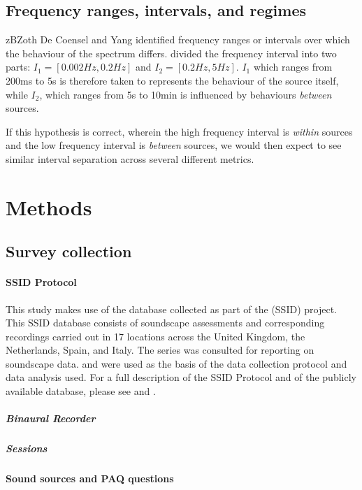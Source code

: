 \subsection{Frequency ranges, intervals, and regimes}

zBZoth De Coensel and Yang identified frequency ranges or intervals over which the behaviour of the spectrum differs. \citet{deCoensel20031f} divided the frequency interval into two parts: $I_1 = [0.002 Hz, 0.2 Hz]$ and $I_2 = [0.2 Hz, 5 Hz]$. $I_1$ which ranges from 200ms to 5s is therefore taken to represents the behaviour of the source itself, while $I_2$, which ranges from 5s to 10min is influenced by behaviours \emph{between} sources.

If this hypothesis is correct, wherein the high frequency interval is \emph{within} sources and the low frequency interval is \emph{between} sources, we would then expect to see similar interval separation across several different metrics.


\section{Methods}
\subsection{Survey collection}

\paragraph{SSID Protocol} This study makes use of the database collected as part of the (SSID) project. This SSID database consists of soundscape assessments and corresponding recordings carried out in 17 locations across the United Kingdom, the Netherlands, Spain, and Italy. The \citet{ISO12913Part1} series was consulted for reporting on soundscape data. \citet{ISO12913Part2} and \citet{ISO12913Part3} were used as the basis of the data collection protocol and data analysis used. For a full description of the SSID Protocol and of the publicly available database, please see \citet{Mitchell2020Soundscape} and \citet{Mitchell2021Database}.

\subparagraph{Binaural Recorder}

\subparagraph{Sessions}

\paragraph{Sound sources and PAQ questions}

